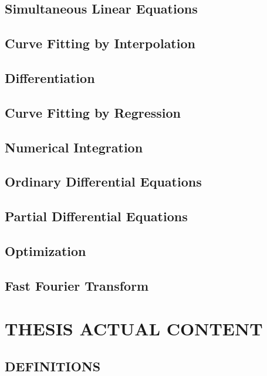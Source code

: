 \documentclass[12pt]{report}
\begin{document}
\section{Simultaneous Linear Equations}

\section{Curve Fitting by Interpolation}

\section{Differentiation}

\section{Curve Fitting by Regression}

\section{Numerical Integration}

\section{Ordinary Differential Equations}

\section{Partial Differential Equations}

\section{Optimization}

\section{Fast Fourier Transform}

\newpage
\chapter{THESIS ACTUAL CONTENT}

\section{DEFINITIONS}
\end{document}
